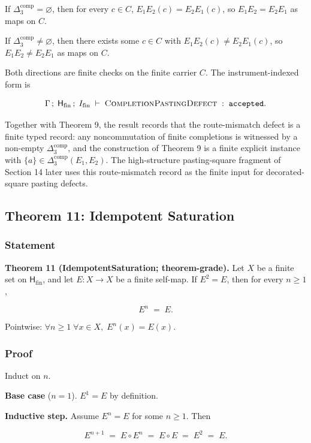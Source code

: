 \documentclass[11pt]{article}
\theoremstyle{definition}
\begin{document}
If \(\Delta_3^{\mathrm{comp}}=\varnothing\), then for every \(c\in C\), \(E_1E_2(c)=E_2E_1(c)\), so \(E_1E_2=E_2E_1\) as maps on \(C\).

If \(\Delta_3^{\mathrm{comp}}\neq\varnothing\), then there exists some \(c\in C\) with \(E_1E_2(c)\neq E_2E_1(c)\), so \(E_1E_2\neq E_2E_1\) as maps on \(C\).

Both directions are finite checks on the finite carrier \(C\). The instrument-indexed form is

\[
\Gamma\,;\;\mathsf H_{\mathrm{fin}}\,;\;I_{\mathrm{fin}}\;\vdash\;\textsc{CompletionPastingDefect}\;:\;\texttt{accepted}.
\]

Together with Theorem 9, the result records that the route-mismatch defect is a finite typed record: any noncommutation of finite completions is witnessed by a non-empty \(\Delta_3^{\mathrm{comp}}\), and the construction of Theorem 9 is a finite explicit instance with \(\{a\}\in\Delta_3^{\mathrm{comp}}(E_1,E_2)\). The high-structure pasting-square fragment of Section 14 later uses this route-mismatch record as the finite input for decorated-square pasting defects.

\subsection{Theorem 11: Idempotent Saturation}

\subsubsection{Statement}

\textbf{Theorem 11 (IdempotentSaturation; theorem-grade).} Let \(X\) be a finite set on \(\mathsf H_{\mathrm{fin}}\), and let \(E:X\to X\) be a finite self-map. If \(E^2=E\), then for every \(n\ge 1\),

\[
E^n\;=\;E.
\]

Pointwise: \(\forall n\ge 1\;\forall x\in X,\;E^n(x)=E(x)\).

\subsubsection{Proof}

Induct on \(n\).

\textbf{Base case} (\(n=1\)). \(E^1=E\) by definition.

\textbf{Inductive step.} Assume \(E^n=E\) for some \(n\ge 1\). Then

\[
E^{n+1}\;=\;E\circ E^n\;=\;E\circ E\;=\;E^2\;=\;E.
\]
\end{document}
